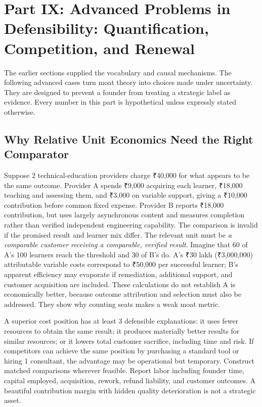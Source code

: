 \section*{Part IX: Advanced Problems in Defensibility: Quantification, Competition, and Renewal}
\label{sec:part9_advanced_defensibility_problems}

The earlier sections supplied the vocabulary and causal mechanisms. The following advanced cases turn moat theory into choices made under uncertainty. They are designed to prevent a founder from treating a strategic label as evidence. Every number in this part is hypothetical unless expressly stated otherwise.

\subsection{Why Relative Unit Economics Need the Right Comparator}
\label{sec:relative_unit_economics_comparator}

Suppose 2 technical-education providers charge ₹40,000 for what appears to be the same outcome. Provider A spends ₹9,000 acquiring each learner, ₹18,000 teaching and assessing them, and ₹3,000 on variable support, giving a ₹10,000 contribution before common fixed expense. Provider B reports ₹18,000 contribution, but uses largely asynchronous content and measures completion rather than verified independent engineering capability. The comparison is invalid if the promised result and learner mix differ. The relevant unit must be \textit{a comparable customer receiving a comparable, verified result}. Imagine that 60 of A's 100 learners reach the threshold and 30 of B's do. A's ₹30 lakh (₹3,000,000) attributable variable costs correspond to ₹50,000 per successful learner; B's apparent efficiency may evaporate if remediation, additional support, and customer acquisition are included. These calculations do not establish A is economically better, because outcome attribution and selection must also be addressed. They show why counting seats makes a weak moat metric.

A superior cost position has at least 3 defensible explanations: it uses fewer resources to obtain the same result; it produces materially better results for similar resources; or it lowers total customer sacrifice, including time and risk. If competitors can achieve the same position by purchasing a standard tool or hiring 1 consultant, the advantage may be operational but temporary. Construct matched comparisons wherever feasible. Report labor including founder time, capital employed, acquisition, rework, refund liability, and customer outcomes. A beautiful contribution margin with hidden quality deterioration is not a strategic asset.

